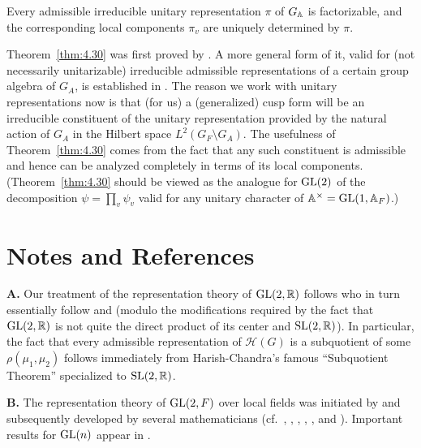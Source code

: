 \begin{theorem}\label{thm:4.30}

Every admissible irreducible unitary representation $\pi$ of $G_{\mathbb{A}}$ is factorizable, and the corresponding local components $\pi_v$ are uniquely determined by $\pi$.

\end{theorem}

\begin{remark}\label{rem:4.31}

Theorem~\ref{thm:4.30} was first proved by \cite{GelfandGraevPyatetskiiShapiro}. A more general form of it, valid for (not necessarily unitarizable) irreducible admissible representations of a certain group algebra of $G_A$, is established in \cite{JacquetLanglands}. The reason we work with unitary representations now is that (for us) a (generalized) cusp form will be an irreducible constituent of the unitary representation provided by the natural action of $G_A$ in the Hilbert space $L^2(G_F \setminus G_A)$. The usefulness of Theorem~\ref{thm:4.30} comes from the fact that any such constituent is admissible and hence can be analyzed completely in terms of its local components. (Theorem~\ref{thm:4.30} should be viewed as the analogue for $\operatorname{GL}(2)$ of the decomposition $\psi = \prod_v \psi_v$ valid for any unitary character of $\mathbb{A}^{\times} = \operatorname{GL}(1, \mathbb{A}_F)$.)

\end{remark}

\section*{Notes and References}


\textbf{A.} Our treatment of the representation theory of $\operatorname{GL}(2,\mathbb{R})$ follows \cite{JacquetLanglands} who in turn essentially follow \cite{Bargmann} and \cite{HarishChandra2} (modulo the modifications required by the fact that $\operatorname{GL}(2,\mathbb{R})$ is not quite the direct product of its center and $\operatorname{SL}(2,\mathbb{R})$). In particular, the fact that every admissible representation of $\mathcal{H}(G)$ is a subquotient of some $\rho(\mu_1, \mu_2)$ follows immediately from Harish-Chandra's famous ``Subquotient Theorem'' specialized to $\operatorname{SL}(2,\mathbb{R})$.

\textbf{B.} The representation theory of $\operatorname{GL}(2,F)$ over local fields was initiated by \cite{Mautner} and subsequently developed by several mathematicians (cf.\ \cite{Shalika}, \cite{Tanaka}, \cite{GelfandGraevPyatetskiiShapiro}, \cite{SallyShalika}, \cite{Silberger}, and \cite{JacquetLanglands}). Important results for $\operatorname{GL}(n)$ appear in \cite{Howe}.

